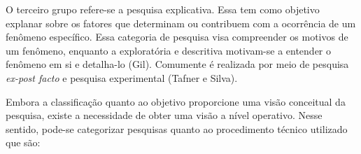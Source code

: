 \par
  \indent O terceiro grupo refere-se a pesquisa explicativa. Essa tem como objetivo explanar sobre os fatores que determinam ou contribuem com  a ocorrência de um fenômeno específico. Essa categoria de pesquisa visa compreender os motivos de um fenômeno, enquanto a exploratória e descritiva motivam-se a entender o fenômeno em si e detalha-lo (Gil). Comumente é realizada por meio de pesquisa \textit{ ex-post facto} e pesquisa experimental (Tafner e Silva). 

 \par
 \indent Embora a classificação quanto ao objetivo proporcione uma visão conceitual da pesquisa, existe a necessidade de obter uma visão a nível operativo. Nesse sentido, pode-se categorizar pesquisas quanto ao procedimento técnico utilizado que são:
 

